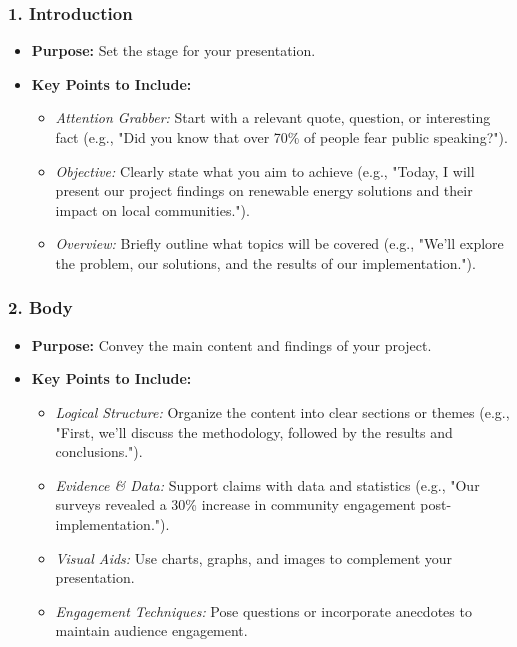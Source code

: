 \documentclass[aspectratio=169]{beamer}
\begin{document}
\begin{frame}[fragile]
    \frametitle{1. Introduction}
    \begin{itemize}
        \item \textbf{Purpose:} Set the stage for your presentation.
        \item \textbf{Key Points to Include:}
        \begin{itemize}
            \item \textit{Attention Grabber:} Start with a relevant quote, question, or interesting fact (e.g., "Did you know that over 70\% of people fear public speaking?").
            \item \textit{Objective:} Clearly state what you aim to achieve (e.g., "Today, I will present our project findings on renewable energy solutions and their impact on local communities.").
            \item \textit{Overview:} Briefly outline what topics will be covered (e.g., "We’ll explore the problem, our solutions, and the results of our implementation.").
        \end{itemize}
    \end{itemize}
\end{frame}

\begin{frame}[fragile]
    \frametitle{2. Body}
    \begin{itemize}
        \item \textbf{Purpose:} Convey the main content and findings of your project.
        \item \textbf{Key Points to Include:}
        \begin{itemize}
            \item \textit{Logical Structure:} Organize the content into clear sections or themes (e.g., "First, we’ll discuss the methodology, followed by the results and conclusions.").
            \item \textit{Evidence \& Data:} Support claims with data and statistics (e.g., "Our surveys revealed a 30\% increase in community engagement post-implementation.").
            \item \textit{Visual Aids:} Use charts, graphs, and images to complement your presentation.
            \item \textit{Engagement Techniques:} Pose questions or incorporate anecdotes to maintain audience engagement.
        \end{itemize}
    \end{itemize}
\end{frame}
\end{document}
